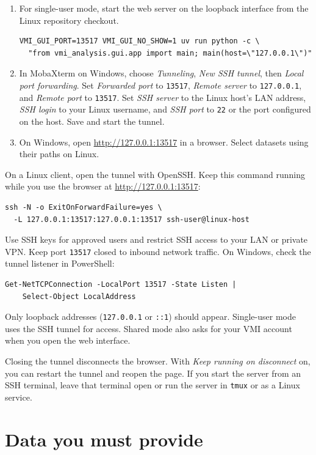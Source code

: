 \documentclass[11pt,a4paper]{article}
\newcommand{\code}[1]{\texttt{#1}}
\begin{document}
\begin{enumerate}
  \item For single-user mode, start the web server on the loopback interface
    from the Linux repository checkout.
\begin{verbatim}
VMI_GUI_PORT=13517 VMI_GUI_NO_SHOW=1 uv run python -c \
  "from vmi_analysis.gui.app import main; main(host=\"127.0.0.1\")"
\end{verbatim}
  \item In MobaXterm on Windows, choose \emph{Tunneling},
    \emph{New SSH tunnel}, then \emph{Local port forwarding}. Set
    \emph{Forwarded port} to \code{13517}, \emph{Remote server} to
    \code{127.0.0.1}, and \emph{Remote port} to \code{13517}. Set
    \emph{SSH server} to the Linux host's LAN address, \emph{SSH login}
    to your Linux username, and \emph{SSH port} to \code{22} or the port
    configured on the host. Save and start the tunnel.
  \item On Windows, open \url{http://127.0.0.1:13517} in a browser.
    Select datasets using their paths on Linux.
\end{enumerate}

On a Linux client, open the tunnel with OpenSSH. Keep this command running
while you use the browser at \url{http://127.0.0.1:13517}:
\begin{verbatim}
ssh -N -o ExitOnForwardFailure=yes \
  -L 127.0.0.1:13517:127.0.0.1:13517 ssh-user@linux-host
\end{verbatim}

Use SSH keys for approved users and restrict SSH access to your LAN or
private VPN. Keep port \code{13517} closed to inbound network traffic.
On Windows, check the tunnel listener in PowerShell:
\begin{verbatim}
Get-NetTCPConnection -LocalPort 13517 -State Listen |
    Select-Object LocalAddress
\end{verbatim}
Only loopback addresses (\code{127.0.0.1} or \code{::1}) should appear.
Single-user mode uses the SSH tunnel for access. Shared mode also asks for
your VMI account when you open the web interface.

Closing the tunnel disconnects the browser. With \emph{Keep running on
disconnect} on, you can restart the tunnel and reopen the page. If you start
the server from an SSH terminal, leave that terminal open or run the server
in \code{tmux} or as a Linux service.

\section{Data you must provide}
\label{sec:data}
\end{document}
